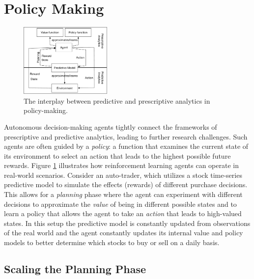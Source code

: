 \documentclass[11pt]{article}
\begin{document}
\section{Policy Making} 
    \label{sub:sequential_decision_making}
    
\begin{figure}
\centering
    \centering
    \includegraphics[width=0.4\textwidth]{figs/RLpolicy.pdf}
    \caption{The interplay between predictive and prescriptive analytics in policy-making.}
    \label{fig:RLpolicy}
\end{figure}

Autonomous decision-making agents tightly connect the frameworks of prescriptive and predictive analytics, leading to further research challenges. Such agents are
often guided by a \textit{policy}: a function that examines the current state of its environment to select an action that leads to the highest possible future rewards. Figure \ref{fig:RLpolicy} illustrates how reinforcement learning agents can operate in real-world scenarios. Consider an auto-trader, which utilizes a stock time-series predictive model to simulate the effects (rewards) of different purchase decisions. This allows for a \textit{planning} phase where the agent can experiment with different decisions to approximate the \textit{value} of being in different possible states and to learn a policy that allows the agent to take an \textit{action} that leads to high-valued states. In this setup the predictive model is constantly updated from observations of the real world and the agent constantly updates its internal value and policy models to better determine which stocks to buy or sell on a daily basis.

\subsection{Scaling the Planning Phase}
\end{document}

